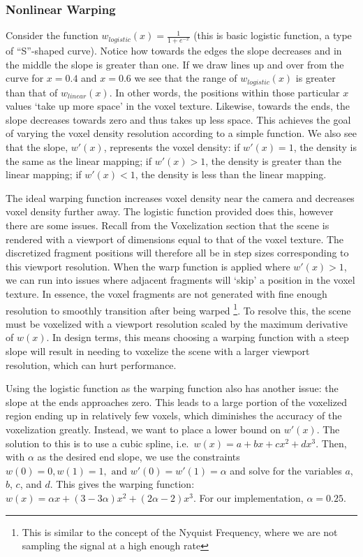\subsubsection{Nonlinear Warping}
Consider the function $w_{logistic}(x) = \frac{1}{1 + e^{-x}}$ (this is basic logistic function, a type of ``S''-shaped curve). Notice how towards the edges the slope decreases and in the middle the slope is greater than one. If we draw lines up and over from the curve for $x = 0.4$ and $x = 0.6$ we see that the range of $w_{logistic}(x)$ is greater than that of $w_{linear}(x)$. In other words, the positions within those particular $x$ values `take up more space' in the voxel texture. Likewise, towards the ends, the slope decreases towards zero and thus takes up less space. This achieves the goal of varying the voxel density resolution according to a simple function. We also see that the slope, $w'(x)$, represents the voxel density: if $w'(x) = 1$, the density is the same as the linear mapping; if $w'(x) > 1$, the density is greater than the linear mapping; if $w'(x) < 1$, the density is less than the linear mapping.

The ideal warping function increases voxel density near the camera and decreases voxel density further away. The logistic function provided does this, however there are some issues. Recall from the Voxelization section that the scene is rendered with a viewport of dimensions equal to that of the voxel texture. The discretized fragment positions will therefore all be in step sizes corresponding to this viewport resolution. When the warp function is applied where $w'(x) > 1$, we can run into issues where adjacent fragments will `skip' a position in the voxel texture. In essence, the voxel fragments are not generated with fine enough resolution to smoothly transition after being warped \footnote{This is similar to the concept of the Nyquist Frequency, where we are not sampling the signal at a high enough rate}. To resolve this, the scene must be voxelized with a viewport resolution scaled by the maximum derivative of $w(x)$. In design terms, this means choosing a warping function with a steep slope will result in needing to voxelize the scene with a larger viewport resolution, which can hurt performance. %

Using the logistic function as the warping function also has another issue: the slope at the ends approaches zero. This leads to a large portion of the voxelized region ending up in relatively few voxels, which diminishes the accuracy of the voxelization greatly. %
Instead, we want to place a lower bound on $w'(x)$. The solution to this is to use a cubic spline, i.e.\ $w(x) = a + bx + cx^2 + dx^3$. Then, with $\alpha$ as the desired end slope, we use the constraints $w(0) = 0, w(1) = 1, \text{ and } w'(0) = w'(1) = \alpha$ and solve for the variables $a$, $b$, $c$, and $d$. This gives the warping function: $w(x) = \alpha x + (3 - 3 \alpha) x^2 + (2 \alpha - 2) x^3$. For our implementation, $\alpha = 0.25$.

